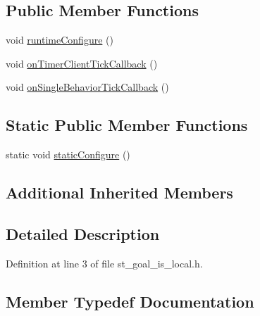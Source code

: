 \subsection*{Public Member Functions}
\begin{DoxyCompactItemize}
\item 
void \hyperlink{structsm__pr2__plugs_1_1StGoalIsLocal_aeddacc72a9eefe2a51d24564874f1610}{runtime\+Configure} ()
\item 
void \hyperlink{structsm__pr2__plugs_1_1StGoalIsLocal_a3a851e3468f6b247139f16abd1b91af3}{on\+Timer\+Client\+Tick\+Callback} ()
\item 
void \hyperlink{structsm__pr2__plugs_1_1StGoalIsLocal_a4d5abf255b17a81fe4a758a07f502e7d}{on\+Single\+Behavior\+Tick\+Callback} ()
\end{DoxyCompactItemize}
\subsection*{Static Public Member Functions}
\begin{DoxyCompactItemize}
\item 
static void \hyperlink{structsm__pr2__plugs_1_1StGoalIsLocal_a7fde75ffa3d95e2f5153c35596817ab4}{static\+Configure} ()
\end{DoxyCompactItemize}
\subsection*{Additional Inherited Members}


\subsection{Detailed Description}


Definition at line 3 of file st\+\_\+goal\+\_\+is\+\_\+local.\+h.



\subsection{Member Typedef Documentation}
\mbox{\label{structsm__pr2__plugs_1_1StGoalIsLocal_a5e2307f3b40c73716bdb763e1d92dce2}} 
